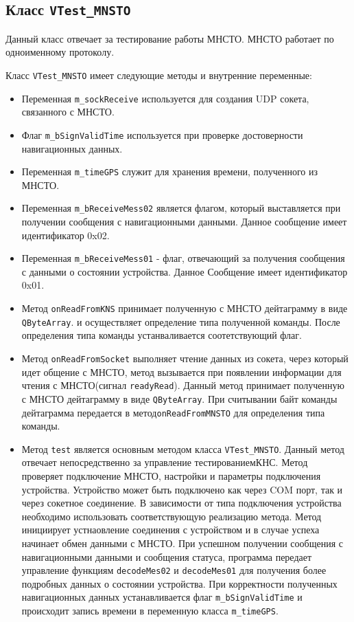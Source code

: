 \subsection{Класс \texttt{VTest\_MNSTO}}
Данный класс отвечает за тестирование работы МНСТО. МНСТО работает по одноименному протоколу.

Класс \texttt{VTest\_MNSTO} имеет следующие методы и внутренние переменные:
\begin{itemize}
	\item Переменная \texttt{m\_sockReceive} используется для создания UDP сокета, связанного с МНСТО.

	\item Флаг \texttt{m\_bSignValidTime} используется при проверке достоверности навигационных данных.

	\item Переменная \texttt{m\_timeGPS} служит для хранения времени, полученного из МНСТО.

	\item Переменная \texttt{m\_bReceiveMess02} является флагом, который выставляется при получении сообщения с
		навигационными данными. Данное сообщение имеет идентификатор 0x02.

	\item Переменная \texttt{m\_bReceiveMess01} - флаг, отвечающий за получения сообщения с данными о состоянии
		устройства.
		Данное Сообщение имеет идентификатор 0x01.

	\item Метод \texttt{onReadFromKNS} принимает полученную с МНСТО дейтаграмму в виде \texttt{QByteArray}.
		и осуществляет определение типа полученной команды. После определения типа команды устанваливается
		соотетствующий флаг.

	\item Метод \texttt{onReadFromSocket} выполняет чтение данных из сокета, через который идет общение с МНСТО,
		метод вызывается при появлении информации для чтения с МНСТО(сигнал \texttt{readyRead}).
		Данный метод принимает полученную с МНСТО дейтаграмму в виде \texttt{QByteArray}.
		При считывании байт команды дейтаграмма передается в метод\break \texttt{onReadFromMNSTO} для определения типа
		команды.

	\item Метод \texttt{test} является основным методом класса \texttt{VTest\_MNSTO}. Данный метод отвечает
		непосредственно за управление тестированием\break КНС. Метод проверяет подключение МНСТО, настройки и
		параметры подключения устройства. Устройство может быть подключено как через COM порт, так и через
		сокетное соединение. В зависимости от типа подключения устройства необходимо использовать
		соответствующую реализацию метода. Метод инициирует устнаовление соединения с устройством и в случае
		успеха начинает обмен данными с МНСТО. При успешном получении сообщения с навигационными данными и сообщения
		статуса, программа передает управление функциям \texttt{decodeMes02} и \texttt{decodeMes01} для
		получения более подробных данных о состоянии устройства. При корректности полученных навигационных
		данных устанавливается флаг \texttt{m\_bSignValidTime} и происходит запись времени в переменную класса
		\texttt{m\_timeGPS}.


\end{itemize}
